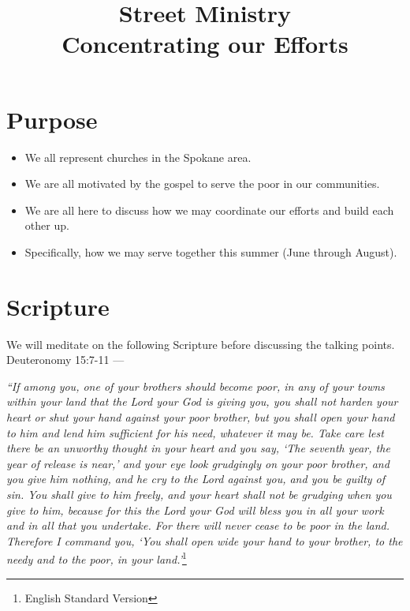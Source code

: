\documentclass[10pt]{article}
\title{Street Ministry \\
    \large Concentrating our Efforts }
\begin{document}
\maketitle
\section{Purpose}
    \begin{itemize}
        \item{We all represent churches in the Spokane area.}
        \item{We are all motivated by the gospel to serve the poor in our communities.}
        \item{We are all here to discuss how we may coordinate our efforts and build each other up.}
        \item{Specifically, how we may serve together this summer (June through August).}
    \end{itemize}

\section{Scripture}
    We will meditate on the following Scripture before discussing the talking points. \\
    Deuteronomy 15:7-11 ---
    \begin{center}
        \textit{“If among you, one of your brothers should become poor, in any of your towns within your land that the Lord your God is giving you, you shall not harden your heart or shut your hand against your poor brother, but you shall open your hand to him and lend him sufficient for his need, whatever it may be. Take care lest there be an unworthy thought in your heart and you say, ‘The seventh year, the year of release is near,’ and your eye look grudgingly on your poor brother, and you give him nothing, and he cry to the Lord against you, and you be guilty of sin. You shall give to him freely, and your heart shall not be grudging when you give to him, because for this the Lord your God will bless you in all your work and in all that you undertake. For there will never cease to be poor in the land. Therefore I command you, ‘You shall open wide your hand to your brother, to the needy and to the poor, in your land.’}\footnote{English Standard Version}
    \end{center}

\clearpage
\end{document}
